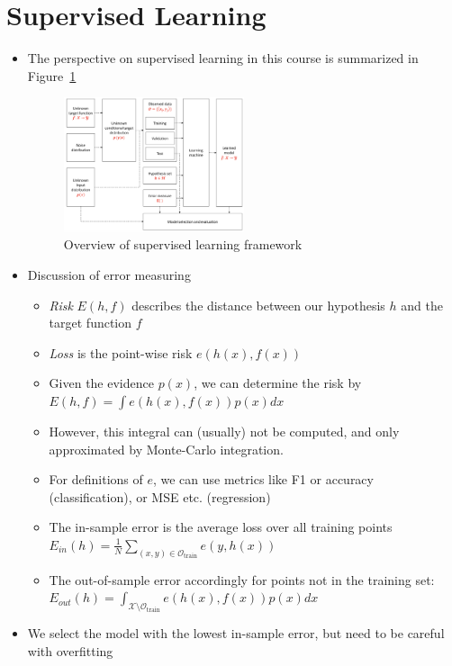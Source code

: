 \section{Supervised Learning}
\begin{itemize}
	\item The perspective on supervised learning in this course is summarized in Figure~\ref{fig:chapter_6_supervised_learning}
	\begin{figure}[ht!]
		\centering
		\includegraphics[width=0.5\textwidth]{figures/chapter_6_supervised_learning_overview.png}
		\caption{Overview of supervised learning framework}
		\label{fig:chapter_6_supervised_learning}
	\end{figure}
	\item Discussion of error measuring
	\begin{itemize}
		\item \textit{Risk} $E(h,f)$ describes the distance between our hypothesis $h$ and the target function $f$
		\item \textit{Loss} is the point-wise risk $e(h(x),f(x))$
		\item Given the evidence $p(x)$, we can determine the risk by $E(h,f)=\int e(h(x), f(x)) p(x) dx$
		\item However, this integral can (usually) not be computed, and only approximated by Monte-Carlo integration. 
		\item For definitions of $e$, we can use metrics like F1 or accuracy (classification), or MSE etc. (regression)
		\item The in-sample error is the average loss over all training points $E_{in}(h)=\frac{1}{N}\sum_{(x,y) \in \mathcal{O}_{\text{train}}} e(y, h(x))$
		\item The out-of-sample error accordingly for points not in the training set:\\
		$E_{out}(h)=\int_{\mathcal{X}\setminus \mathcal{O}_{\text{train}}} e(h(x), f(x)) p(x) dx$
	\end{itemize}
	\item We select the model with the lowest in-sample error, but need to be careful with overfitting
\end{itemize}
